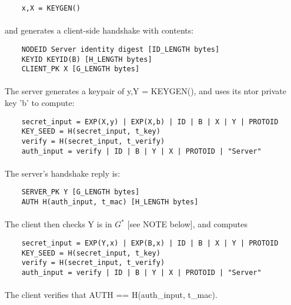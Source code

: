\begin{verbatim}
    x,X = KEYGEN()
\end{verbatim}

\paragraph{}
and generates a client-side handshake with contents:
\begin{verbatim}
    NODEID Server identity digest [ID_LENGTH bytes]
    KEYID KEYID(B) [H_LENGTH bytes]
    CLIENT_PK X [G_LENGTH bytes]
\end{verbatim}

\paragraph{}
The server generates a keypair of y,Y = KEYGEN(), and uses its ntor
private key 'b' to compute:

\begin{verbatim}
    secret_input = EXP(X,y) | EXP(X,b) | ID | B | X | Y | PROTOID
    KEY_SEED = H(secret_input, t_key)
    verify = H(secret_input, t_verify)
    auth_input = verify | ID | B | Y | X | PROTOID | "Server"
\end{verbatim}

\paragraph{}
The server's handshake reply is:

\begin{verbatim}
    SERVER_PK Y [G_LENGTH bytes]
    AUTH H(auth_input, t_mac) [H_LENGTH bytes]
\end{verbatim}

\paragraph{}
The client then checks Y is in $G^*$ [see NOTE below], and computes

\begin{verbatim}
    secret_input = EXP(Y,x) | EXP(B,x) | ID | B | X | Y | PROTOID
    KEY_SEED = H(secret_input, t_key)
    verify = H(secret_input, t_verify)
    auth_input = verify | ID | B | Y | X | PROTOID | "Server"
\end{verbatim}

\paragraph{}
The client verifies that AUTH == H(auth\_input, t\_mac).

